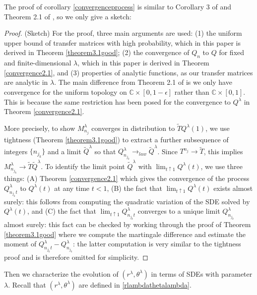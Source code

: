 \documentclass[12pt, reqno]{amsart}
\theoremstyle{definition}
\theoremstyle{remark}
\numberwithin{equation}{section}
\begin{document}
The proof of corollary \ref{convergenceprocess} is similar to Corollary 3 of \cite{kritchevski2011scaling} and Theorem 2.1 of \cite{rifkind2018eigenvectors}, so we only give a sketch:
\begin{proof}(Sketch) 
For the proof, 
three main arguments are used: (1) the uniform upper bound of transfer matrices with high probability, which in this paper is derived in Theorem \ref{theorem3.1good}; (2) the convergence of $Q_n$ to $Q$ for fixed and finite-dimensional $\lambda$, which in this paper is derived in Theorem \eqref{convergence2.1}, and (3) properties of analytic functions, as our transfer matrices are analytic in $\lambda$. The main difference from Theorem 2.1 of \cite{rifkind2018eigenvectors} is we only have convergence for the uniform topology on $\mathbb{C}\times[0,1-\epsilon]$ rather than $\mathbb{C}\times[0,1]$. This is because the same restriction has been posed for the convergence to $Q^\lambda$ in Theorem \ref{convergence2.1}.


More precisely, to show $M_{n_j}^\lambda$ converges in distribution to $\widetilde{T}Q^\lambda(1)$, we use tightness (Theorem \ref{theorem3.1good}) to extract a further subsequence of integers $\{n_{j_k}\}$ and a limit $\widetilde{Q}^\lambda$ so that $Q_{n_{j_k}}^\lambda\to_{law} \widetilde{Q}^\lambda$. Since $T^{n_j}\to \widetilde{T}$, this implies $M^\lambda_{n_{j_k}}\to \widetilde{T}\widetilde{Q}^\lambda$. To identify the limit point $\widetilde{Q}^\lambda$ with $\lim_{t\uparrow 1}Q^\lambda(t)$, we use three things: (A) Theorem \eqref{convergence2.1} which gives the convergence of the process $Q^\lambda_{n_{j_k}t}$ to $Q^\lambda(t)$ at any time $t<1$, (B) the fact that $\lim_{t\uparrow 1}Q^\lambda(t)$ exists almost surely: this follows from computing the quadratic variation of the SDE solved by $Q^\lambda(t)$, and (C) the fact that $\lim_{t\uparrow 1}Q^\lambda_{n_{j_k}t}$ converges to a unique limit $Q^\lambda_{n_{j_k}}$ almost surely: this fact can be checked by working through the proof of Theorem \ref{theorem3.1good} where we compute the martingale difference and estimate the moment of $Q_{n_{j_k}t}^\lambda-Q_{n_{j_k}}^\lambda$: the latter computation is very similar to the tightness proof and is therefore omitted for simplicity.
\end{proof}
Then we characterize the evolution of $(r^\lambda,\theta^\lambda)$ in terms of SDEs with parameter $\lambda$. Recall that $(r^\lambda,\theta^\lambda)$ are defined in \eqref{rlambdathetalambda}.
\end{document}
